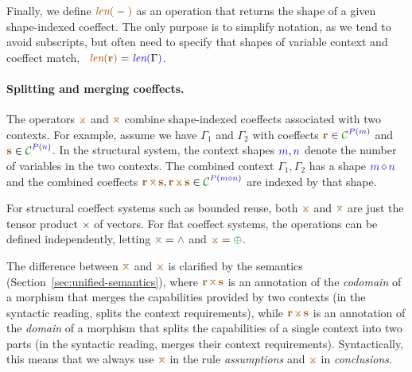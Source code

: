 Finally, we define $\alen{-}$ as an operation that returns the shape of a given shape-indexed 
coeffect. The only purpose is to simplify notation, as we tend to avoid subscripts, but often need 
to specify that shapes of variable context and coeffect match, 
\eg~$\alen{\aclrd{\textbf{r}}} = \slen{\Gamma}$.

\paragraph{Splitting and merging coeffects.}
The operators $\apar$ and $\azip$ combine shape-indexed coeffects associated with two contexts. 
For example, assume we have $\Gamma_1$ and $\Gamma_2$ with coeffects $\aclrd{\textbf{r}} \in 
\C^{\SP(\sclrd{m})}$ and $\aclrd{\textbf{s}} \in \C^{\SP(\sclrd{n})}$. In the structural system, the 
context shapes $\sclrd{m}, \sclrd{n}$ denote the number of variables in the two contexts. The 
combined context $\Gamma_1, \Gamma_2$ has a shape $\sclrd{m}\,\stimes\,\sclrd{n}$ and the combined 
coeffects $\aclrd{\textbf{r}} \,\azip\, \aclrd{\textbf{s}}, \aclrd{\textbf{r}} \,\apar\, \aclrd{\textbf{s}} 
\in \C^{\SP(\sclrd{m} \stimes \sclrd{n})}$ are indexed by that shape.

For structural coeffect systems such as bounded reuse, both $\apar$ and $\azip$ are
just the tensor product $\times$ of vectors. For flat coeffect systems, the operations
can be defined independently, letting $\azip=\czip$ and $\apar=\cpar$.

The difference between $\azip$ and $\apar$ is clarified by the semantics (Sec\-tion~\ref{sec:unified-semantics}), 
where $\aclrd{\textbf{r}}\,\azip\,\aclrd{\textbf{s}}$ is an annotation of the \emph{codomain} of 
a morphism that merges the capabilities provided by two contexts (in the syntactic 
reading, splits the context requirements), while $\aclrd{\textbf{r}}\,\apar\,\aclrd{\textbf{s}}$ 
is an annotation of the \emph{domain} of a morphism that splits the capabilities of a single 
context into two parts (in the syntactic reading, merges their context requirements). 
Syntactically, this means that we always use $\azip$ in the rule \emph{assumptions} and 
$\apar$ in \emph{conclusions}. 


\newcommand{\tystmt}[2]{ (\text{\footnotesize{#1}})~~{#2} }
\newcommand{\ctxtrans}[3]{ #2 \rightsquigarrow #1, #3 }
\newcommand{\ctxtransnl}[3]{ \begin{array}{l} #2 \rightsquigarrow\\ #1, #3 \end{array}}

